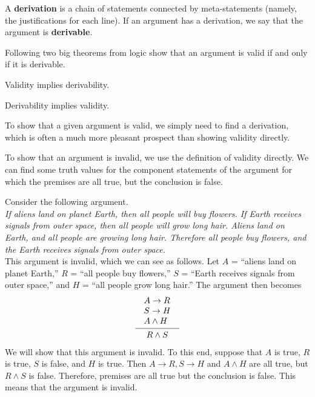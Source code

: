 \documentclass[a4paper,english,12pt]{article}
\begin{document}
\begin{defn}[Derivation] A \textbf{derivation} is a chain of statements connected by meta-statements (namely, the justifications for each line). If an argument has a derivation, we say that the argument is \textbf{derivable}.
\end{defn}
Following two big theorems from logic show that an argument is valid if and only if it is derivable.
\begin{thm} Validity implies derivability.
\end{thm}
\begin{thm} Derivability implies validity.
\end{thm}
\begin{rem} To show that a given argument is valid, we simply need to find a derivation, which is often a much more pleasant prospect than showing validity directly.
\end{rem}
\begin{rem} To show that an argument is invalid, we use the definition of validity directly. We can find some truth values for the component statements of the argument for which the premises are all true, but the conclusion is false.
\end{rem}
    
\begin{exmp}
Consider the following argument.\\
\emph{
If aliens land on planet Earth, then all people will buy flowers. If Earth receives signals from outer space, then all people will grow long hair. Aliens land on Earth, and all people are growing long hair. Therefore all people buy flowers, and the Earth receives signals from outer space.}\\
			This argument is invalid, which we can see as follows. Let $A$ = ``aliens land on planet Earth,'' $R$ = ``all people buy flowers,'' $S$ = ``Earth receives signals from outer space,'' and $H$ = ``all people grow long hair.'' The argument then becomes
\begin{equation*}
\infer{\begin{array}{@{}llr@{}llr@{}llr@{}}&R \wedge S& \end{array}}{\begin{array}{@{}llr@{}llr@{}llr@{}} &A \rightarrow R&\\&S \rightarrow H&\\&A \wedge H&\end{array}}
\end{equation*}
We will show that this argument is invalid. To this end, suppose that $A$ is true, $R$ is true, $S$ is false, and $H$ is true. Then $A \rightarrow R, S\rightarrow H$ and $A \wedge H$ are all true, but $R \wedge S$ is false. Therefore, premises are all true but the conclusion is false. This means that the argument is invalid.	 
\end{exmp}
\end{document}
